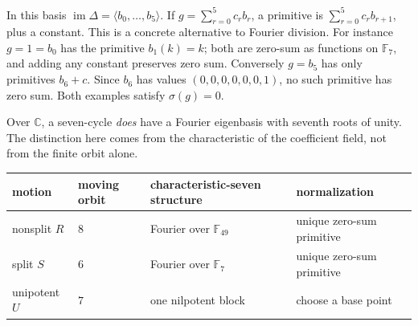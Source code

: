 \documentclass[11pt]{article}
\theoremstyle{definition}
\theoremstyle{remark}
\newcommand{\F}{\mathbb F}
\newcommand{\C}{\mathbb C}
\newcommand{\im}{\operatorname{im}}
\begin{document}
In this basis $\im\Delta=\langle b_0,\ldots,b_5\rangle$.
If $g=\sum_{r=0}^5c_rb_r$, a primitive is
$\sum_{r=0}^5c_rb_{r+1}$, plus a constant. This is a concrete alternative to
Fourier division. For instance $g=1=b_0$ has the primitive $b_1(k)=k$;
both are zero-sum as functions on $\F_7$, and adding any constant preserves
zero sum. Conversely $g=b_5$ has only primitives $b_6+c$.
Since $b_6$ has values $(0,0,0,0,0,0,1)$, no such primitive has zero sum.
Both examples satisfy $\sigma(g)=0$.

Over $\C$, a seven-cycle \emph{does} have a Fourier eigenbasis with seventh
roots of unity. The distinction here comes from the characteristic of the
coefficient field, not from the finite orbit alone.

\begin{center}
\begin{tabular}{@{}llll@{}}
\toprule
motion & moving orbit & characteristic-seven structure & normalization\\
\midrule
nonsplit $R$ & $8$ & Fourier over $\F_{49}$ & unique zero-sum primitive\\
split $S$ & $6$ & Fourier over $\F_7$ & unique zero-sum primitive\\
unipotent $U$ & $7$ & one nilpotent block & choose a base point\\
\bottomrule
\end{tabular}
\end{center}
\end{document}
